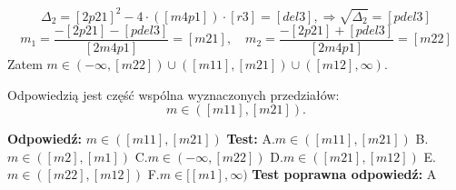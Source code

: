 \documentclass[12pt, a4paper]{article}
\theoremstyle{definition} %
\newcommand{\rozwStop}{\newline}                                            %
\newcommand{\odpStart}{\noindent \textbf{Odpowiedź:}\newline}    %
\newcommand{\odpStop}{\newline}                                             %
\newcommand{\testStart}{\noindent \textbf{Test:}\newline} %
\newcommand{\testStop}{\newline} %
\newcommand{\kluczStart}{\noindent \textbf{Test poprawna odpowiedź:}\newline} %
\newcommand{\kluczStop}{\newline} %
\begin{document}
$$\Delta_{2}=[2p21]^{2}-4\cdot([m4p1])\cdot[r3]=[del3], \Rightarrow \sqrt{\Delta_{2}}=[pdel3]$$
$$m_{1}=\frac{-[2p21]-[pdel3]}{[2m4p1]}=[m21], \quad m_{2}=\frac{-[2p21]+[pdel3]}{[2m4p1]}=[m22]$$
Zatem $m\in(-\infty,[m22])\cup([m11],[m21])\cup([m12],\infty).$

Odpowiedzią jest część wspólna wyznaczonych przedziałów:
$$m\in([m11],[m21]).$$
\rozwStop


\odpStart
$m\in([m11],[m21])$
\odpStop
\testStart
A.$m\in([m11],[m21])$
B.$m\in([m2],[m1])$
C.$m\in(-\infty,[m22])$
D.$m\in([m21],[m12])$
E.$m\in([m22],[m12])$
F.$m\in[[m1],\infty)$
\testStop
\kluczStart
A
\kluczStop
\end{document}
